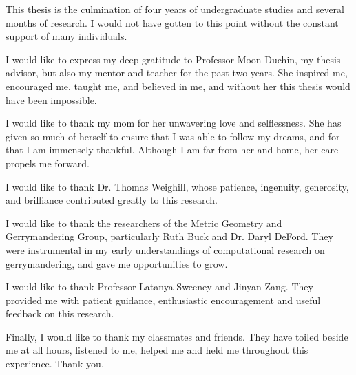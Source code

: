 
This thesis is the culmination of four years of undergraduate studies and several months of research. I would not have gotten to this point without the constant support of many individuals.

I would like to express my deep gratitude to Professor Moon Duchin, my thesis advisor, but also my mentor and teacher for the past two years. She inspired me, encouraged me, taught me, and believed in me, and without her this thesis would have been impossible.

I would like to thank my mom for her unwavering love and selflessness. She has given so much of herself to ensure that I was able to follow my dreams, and for that I am immensely thankful. Although I am far from her and home, her care propels me forward.

I would like to thank Dr. Thomas Weighill, whose patience, ingenuity, generosity, and brilliance contributed greatly to this research.

I would like to thank the researchers of the Metric Geometry and Gerrymandering Group, particularly Ruth Buck and Dr. Daryl DeFord. They were instrumental in my early understandings of computational research on gerrymandering, and gave me opportunities to grow.

I would like to thank Professor Latanya Sweeney and Jinyan Zang. They provided me with patient guidance, enthusiastic encouragement and useful feedback on this research.

Finally, I would like to thank my classmates and friends. They have toiled beside me at all hours, listened to me, helped me and held me throughout this experience. Thank you.
